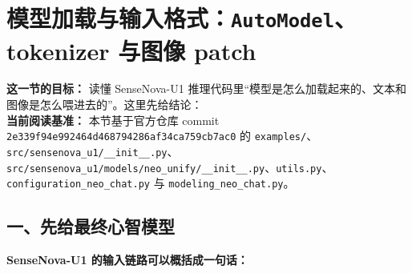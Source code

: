 
\section{模型加载与输入格式：\texttt{AutoModel}、tokenizer 与图像 patch}

\begin{conceptbox}
\textbf{这一节的目标：} 读懂 SenseNova-U1 推理代码里“模型是怎么加载起来的、文本和图像是怎么喂进去的”。这里先给结论：\\
\textbf{当前阅读基准：} 本节基于官方仓库 commit \texttt{2e339f94e992464d468794286af34ca759cb7ac0} 的 \texttt{examples/}、\texttt{src/sensenova\_u1/\_\_init\_\_.py}、\texttt{src/sensenova\_u1/models/neo\_unify/\_\_init\_\_.py}、\texttt{utils.py}、\texttt{configuration\_neo\_chat.py} 与 \texttt{modeling\_neo\_chat.py}。
\end{conceptbox}

\subsection{一、先给最终心智模型}

\begin{summarybox}
\textbf{SenseNova-U1 的输入链路可以概括成一句话：} 
\end{summarybox}

